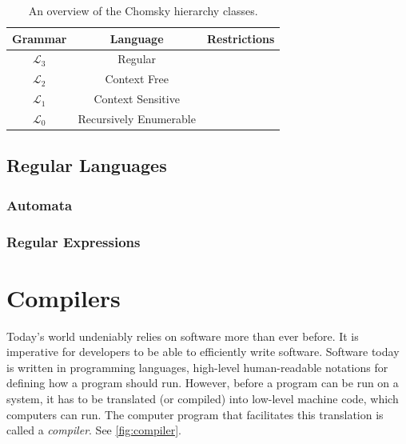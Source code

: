 \begin{table}[h]
\centering
\begin{tabular}{@{}ccl@{}}
\toprule
Grammar         & Language               & Restrictions \\ \midrule
$\mathcal{L}_3$ & Regular                &              \\
$\mathcal{L}_2$ & Context Free           &              \\
$\mathcal{L}_1$ & Context Sensitive      &              \\
$\mathcal{L}_0$ & Recursively Enumerable &              \\ \bottomrule
\end{tabular}
\caption{An overview of the Chomsky hierarchy classes.}
\label{tab:chomsky-hierarchy}
\end{table}

\subsection{Regular Languages}
\subsubsection{Automata}
\subsubsection{Regular Expressions} 







\begin{definition}
\label{def:FSM}
\end{definition}


\begin{definition}
\label{def:regular_exp}
\end{definition}


  


\section{Compilers}


Today's world undeniably relies on software more than ever before. It is imperative for developers to be able to efficiently write software. Software today is written in programming languages, high-level human-readable notations for defining how a program should run. However, before a program can be run on a system, it has to be translated (or compiled) into low-level machine code, which computers can run. The computer program that facilitates this translation is called a \emph{compiler}. See \cref{fig:compiler}.

